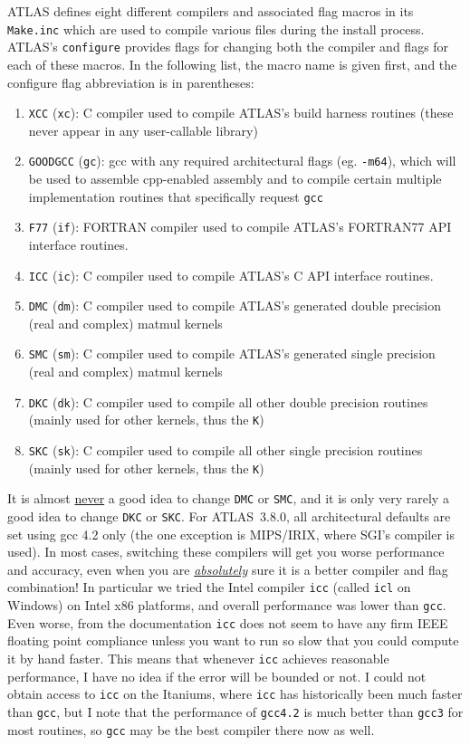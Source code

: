 \documentclass[11pt]{article}
\begin{document}
ATLAS defines eight different compilers and associated flag macros in 
its {\tt Make.inc} which are used to compile various files during the
install process.  ATLAS's {\tt configure} provides flags for changing both the
compiler and flags for each of these macros.  In the following list,
the macro name is given first, and the configure flag abbreviation is in
parentheses:
\begin{enumerate}
\item {\tt XCC} ({\tt xc}): C compiler used to compile ATLAS's build harness routines
                 (these never appear in any user-callable library)
\item {\tt GOODGCC} ({\tt gc}): gcc with any required architectural flags 
      (eg. {\tt -m64}), which will be used to assemble cpp-enabled assembly
      and to compile certain multiple implementation routines that specifically
      request {\tt gcc}
\item {\tt F77} ({\tt if}): FORTRAN compiler used to compile ATLAS's FORTRAN77
                API interface routines.
\item {\tt ICC} ({\tt ic}): C compiler used to compile ATLAS's C API interface
                           routines.
\item {\tt DMC} ({\tt dm}): C compiler used to compile ATLAS's generated
                double precision (real and complex) matmul kernels
\item {\tt SMC} ({\tt sm}): C compiler used to compile ATLAS's generated
                single precision (real and complex) matmul kernels
\item {\tt DKC} ({\tt dk}): C compiler used to compile all other double
                precision routines (mainly used for other kernels, thus the
                {\tt K})
\item {\tt SKC} ({\tt sk}): C compiler used to compile all other single
                precision routines (mainly used for other kernels,
                thus the {\tt K})
\end{enumerate}

It is almost \underline{never} a good idea to change {\tt DMC} or {\tt SMC},
and it is only very rarely a good idea to change {\tt DKC} or {\tt SKC}.
For ATLAS~3.8.0, all architectural defaults are set using gcc 4.2 only
(the one exception is MIPS/IRIX, where SGI's compiler is used).  In most
cases, switching these compilers will get you worse performance and accuracy,
even when you are \underline{\em absolutely} sure it is a better compiler
and flag combination!  In particular we tried the Intel compiler {\tt icc} 
(called {\tt icl} on Windows) on Intel x86 platforms,
and overall performance was lower than {\tt gcc}.  Even worse, 
from the documentation
{\tt icc} does not seem to have any firm IEEE floating point compliance unless
you want to run so slow that you could compute it by hand faster.  This means
that whenever {\tt icc} achieves reasonable performance, I
have no idea if the error will be bounded or not.  I could not obtain
access to {\tt icc} on the Itaniums, where {\tt icc} has historically been
much faster than {\tt gcc}, but I note that the performance of 
{\tt gcc4.2} is much better than {\tt gcc3} for most routines, so {\tt gcc}
may be the best compiler there now as well.
\end{document}
